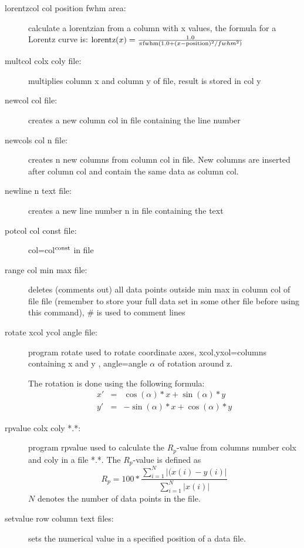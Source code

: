 \begin{description}
\item [\prg lorentzcol col position fwhm area:] calculate a lorentzian from
a column with x values, the formula for a Lorentz curve is: 
${\rm lorentz}(x)=\frac{1.0}{\pi{\rm fwhm}(1.0+(x-{\rm position})^2/fwhm^2)}$
\item [\prg multcol  colx coly file:] multiplies column x and column y of file, %
result is stored in col y
\item [\prg newcol col file:] creates a new column col in file containing the line %
number
\item [\prg newcols col n file:] creates n new columns from column col
 in file. New columns are inserted after column col and contain the same data as column col.
\item [\prg newline n text file:] creates a new line number n  in file containing %
the text 
\item [\prg potcol col const file:]  col=col$^{\rm const}$ in file
\item [\prg range col min max file:] deletes (comments out) all data points outside %
min max in column  col of
                       file file (remember to store your full data set in some other
		       file before using this command), \# is used to comment lines
\item[\prg rotate xcol ycol angle file:]
program rotate  used to rotate coordinate axes,
 xcol,yxol=columns containing x and y , 
 angle=angle $\alpha$ of rotation around z.
 
 The rotation is done using the following formula:
\begin{eqnarray}
 x'&= &\cos(\alpha)*x+\sin(\alpha)*y \nonumber \\
 y'&=&-\sin(\alpha)*x+\cos(\alpha)*y
\end{eqnarray}
\item [\prg rpvalue colx coly  *.*:]  program rpvalue  used to %
calculate 
                       the $R_p$-value from columns number colx and coly 
		       in a file *.*. The $R_p$-value is defined as
		       \begin{equation}
		       R_p= 100*\frac{\sum_{i=1}^{N} |(x(i)-y(i)|}{\sum_{i=1}^{N}|x(i)|}
		       \end{equation}
                       $N$ denotes the number of data points in the file.
\item [\prg setvalue row column text files:] sets the numerical value in a specified position of a data file.


\end{description}
